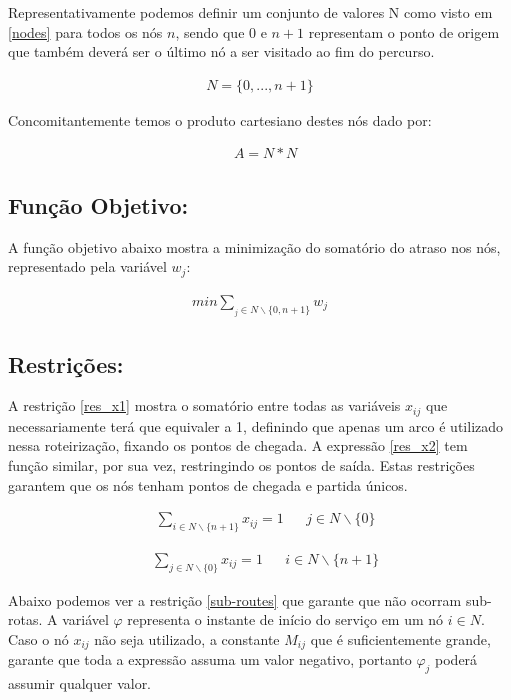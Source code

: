 \documentclass[12pt]{article}
\begin{document}
Representativamente podemos definir um conjunto de valores N como visto em
\eqref{nodes} para todos os nós $n$, sendo que 0 e $n+1$ representam o ponto de
origem que também deverá ser o último nó a ser visitado ao fim do percurso.

\begin{align}
  N = \{0, ..., n+1\} \label{nodes}
\end{align}

Concomitantemente temos o produto cartesiano destes nós dado por:

\begin{align} \label{cartesian_product}
   & A = N * N
\end{align}

\subsection{Função Objetivo:}

A função objetivo abaixo mostra a minimização do somatório do atraso nos nós,
representado pela variável $w_j$:

\begin{align}
  min        \sum_{_j\in N\backslash \{0,n+1\}} w_j \label{obj_func}
\end{align}

\subsection{Restrições:}

A restrição \eqref{res_x1} mostra o somatório entre todas as variáveis $x_{ij}$
que necessariamente terá que equivaler a 1, definindo que apenas um arco é
utilizado nessa roteirização, fixando os pontos de chegada. A expressão
\eqref{res_x2} tem função similar, por sua vez, restringindo os pontos de
saída. Estas restrições garantem que os nós tenham pontos de chegada e partida
únicos.

\begin{align}
   & \sum_{i\in N\backslash \{n+1\}} x_{ij} = 1 &  & j\in N\backslash \{0\} \label{res_x1}
\end{align}

\begin{align}
   & \sum_{j\in N\backslash \{0\}} x_{ij} = 1 &  & i\in N\backslash \{n+1\} \label{res_x2}
\end{align}

Abaixo podemos ver a restrição \eqref{sub-routes} que garante que não ocorram
sub-rotas. A variável $\varphi$ representa o instante de início do serviço em
um nó $i \in N$. Caso o nó $x_{ij}$ não seja utilizado, a constante $M_{ij}$
que é suficientemente grande, garante que toda a expressão assuma um valor
negativo, portanto $\varphi_j$ poderá assumir qualquer valor.
\end{document}
